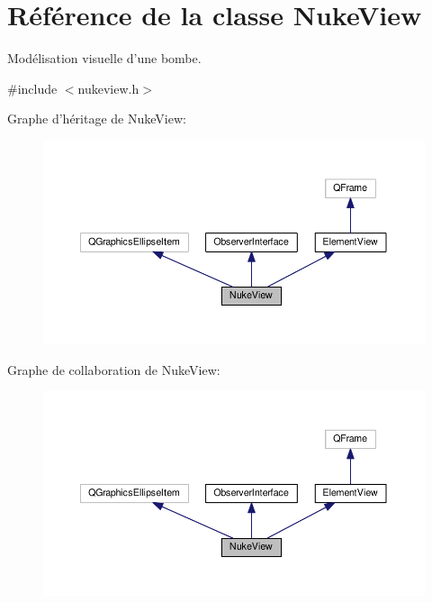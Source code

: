 \hypertarget{classNukeView}{\section{Référence de la classe Nuke\+View}
\label{classNukeView}
}


Modélisation visuelle d’une bombe.  




{\ttfamily \#include $<$nukeview.\+h$>$}



Graphe d'héritage de Nuke\+View\+:
\nopagebreak
\begin{figure}[H]
\begin{center}
\leavevmode
\includegraphics[width=350pt]{da/d21/classNukeView__inherit__graph}
\end{center}
\end{figure}


Graphe de collaboration de Nuke\+View\+:
\nopagebreak
\begin{figure}[H]
\begin{center}
\leavevmode
\includegraphics[width=350pt]{db/d47/classNukeView__coll__graph}
\end{center}
\end{figure}
